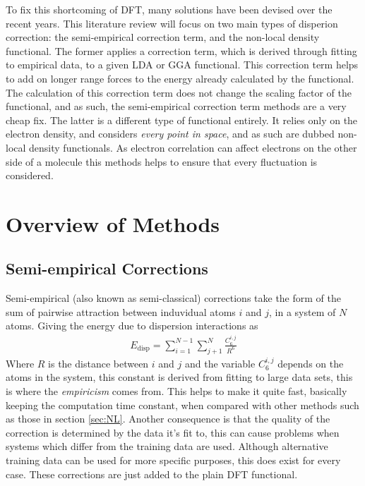 \documentclass[10pt,a4paper,twocolumn,twoside]{extarticle}
\begin{document}
	To fix this shortcoming of DFT, many solutions have been devised over the recent years. This literature review will focus on two main types of disperion correction: the semi-empirical correction term, and the non-local density functional. The former applies a correction term, which is derived through fitting to empirical data, to a given LDA or GGA functional. This correction term helps to add on longer range forces to the energy already calculated by the functional. The calculation of this correction term does not change the scaling factor of the functional, and as such, the semi-empirical correction term methods are a very cheap fix. The latter is a different type of functional entirely. It relies only on the electron density, and considers \emph{every point in space}, and as such are dubbed non-local density functionals. As electron correlation can affect electrons on the other side of a molecule this methods helps to ensure that every fluctuation is considered.

	\section{Overview of Methods}
	\subsection{Semi-empirical Corrections}
	\label{sec:semi-empirical}
	Semi-empirical (also known as semi-classical) corrections take the form of the sum of pairwise attraction between induvidual atoms $i$ and $j$, in a system of $N$ atoms. Giving the energy due to dispersion interactions as 
	\begin{align}
		E_\text{disp} = \sum_{i=1}^{N-1} \sum_{j+1}^N \frac{C^{i,j}_6}{R^6}
	\end{align}
	Where $R$ is the distance between $i$ and $j$ and the variable $C^{i,j}_6$ depends on the atoms in the system, this constant is derived from fitting to large data sets, this is where the \emph{empiricism} comes from. This helps to make it quite fast, basically keeping the computation time constant, when compared with other methods such as those in section \ref{sec:NL}. Another consequence is that the quality of the correction is determined by the data it's fit to, this can cause problems when systems which differ from the training data are used. \cite{Sato2009, Grimme2010} Although alternative training data can be used for more specific purposes\cite{D3-ABC}, this does exist for every case. These corrections are just added to the plain DFT functional.
\end{document}
